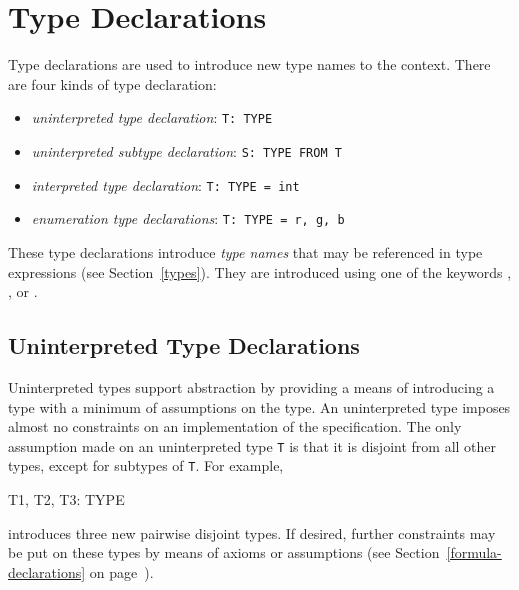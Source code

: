 \section{Type Declarations}\label{type-declarations}

Type declarations are used to introduce new type names to the context.
There are four kinds of type declaration:

\begin{itemize}

\item \emph{uninterpreted type declaration}: \texttt{T:\ TYPE}

\item \emph{uninterpreted subtype declaration}: \texttt{S:\ TYPE FROM T}

\item \emph{interpreted type declaration}: \texttt{T:\ TYPE =
int}

\item \emph{enumeration type declarations}: \texttt{T:\ TYPE = \setb r,
g, b\sete} 

\end{itemize}

These type declarations introduce \emph{type names}
that may be referenced in type expressions (see Section~\ref{types}).
They are introduced using one of the keywords
,
, or
.

\subsection{Uninterpreted Type Declarations}

Uninterpreted types support abstraction by providing a means of
introducing a type with a minimum of assumptions on the type.  An
uninterpreted type imposes almost no constraints on an implementation of
the specification.  The only assumption made on an uninterpreted type
\texttt{T} is that it is disjoint from all other types, except for
subtypes of \texttt{T}.  For example,
\begin{pvsex}
  T1, T2, T3: TYPE
\end{pvsex}
%
introduces three new pairwise disjoint types.  If desired, further
constraints may be put on these types by means of axioms or assumptions
(see Section~\ref{formula-declarations} on
page~\pageref{formula-declarations}).


